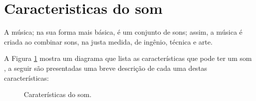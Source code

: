 
\section{Caracteristicas do som}
\label{sec:carateristasom}
A música; na sua forma mais básica,  é um conjunto de sons; assim, 
a música é criada ao combinar sons, na justa medida, de 
ingênio, técnica e arte.

A Figura \ref{fig:carateristicas:som} mostra um diagrama
que lista as características que pode ter um som \cite[pp. 12]{medteoria}, 
a seguir são presentadas uma breve descrição de cada uma destas características:
\begin{figure}[!t]
\centering
{} 
\caption{Caraterísticas do som.}
\label{fig:carateristicas:som}
\end{figure}
